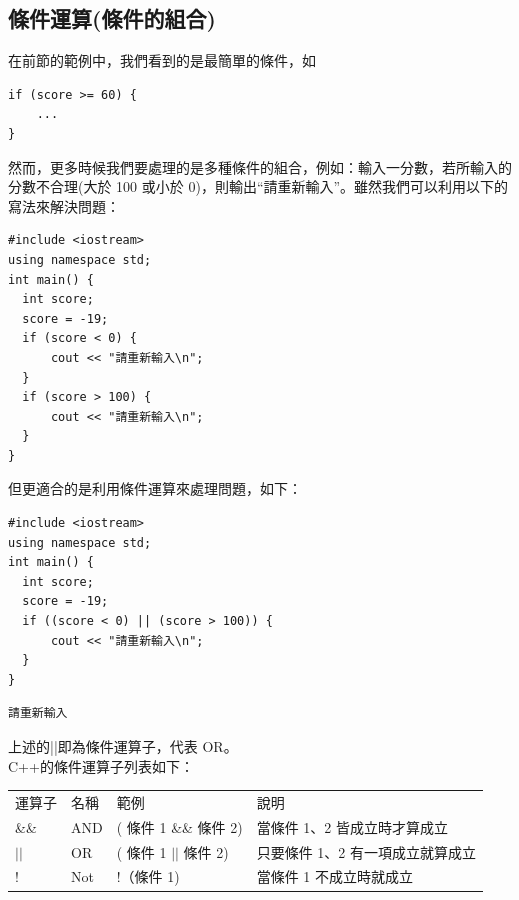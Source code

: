 \documentclass[a4paper,12pt]{article}
\begin{document}
\subsection{條件運算(條件的組合)}
\label{sec:org956bf1a}
在前節的範例中，我們看到的是最簡單的條件，如\\
\lstset{breaklines=true,language=cpp,label= ,caption= ,captionpos=b,firstnumber=1,numbers=left}
\begin{lstlisting}
if (score >= 60) {
    ...
}
\end{lstlisting}
然而，更多時候我們要處理的是多種條件的組合，例如：輸入一分數，若所輸入的分數不合理(大於 100 或小於 0)，則輸出``請重新輸入''。雖然我們可以利用以下的寫法來解決問題：\\
\lstset{breaklines=true,language=cpp,label= ,caption= ,captionpos=b,firstnumber=1,numbers=left}
\begin{lstlisting}
#include <iostream>
using namespace std;
int main() {
  int score;
  score = -19;
  if (score < 0) {
      cout << "請重新輸入\n";
  }
  if (score > 100) {
      cout << "請重新輸入\n";
  }
}
\end{lstlisting}
但更適合的是利用條件運算來處理問題，如下：\\
\lstset{breaklines=true,language=cpp,label= ,caption= ,captionpos=b,firstnumber=1,numbers=left}
\begin{lstlisting}
#include <iostream>
using namespace std;
int main() {
  int score;
  score = -19;
  if ((score < 0) || (score > 100)) {
      cout << "請重新輸入\n";
  }
}
\end{lstlisting}

\begin{verbatim}
請重新輸入
\end{verbatim}


上述的||即為條件運算子，代表 OR。\\

C++的條件運算子列表如下：\\
\begin{center}
\begin{tabular}{llll}
運算子 & 名稱 & 範例 & 說明\\
\&\& & AND & ( 條件 1 \&\& 條件 2) & 當條件 1、2 皆成立時才算成立\\
\(\vert{} \vert{}\) & OR & ( 條件 1 \(\vert{} \vert{}\) 條件 2) & 只要條件 1、2 有一項成立就算成立\\
! & Not & !（條件 1) & 當條件 1 不成立時就成立\\
\end{tabular}
\end{center}
\end{document}
